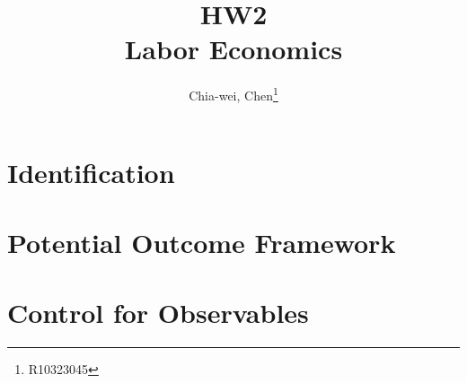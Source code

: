 \documentclass[12pt]{article}
\author{Chia-wei, Chen\thanks{R10323045}}
\title{HW2 \\ Labor Economics}
\begin{document}
    \maketitle

    \section{Identification}
    
    
    
    

    \section{Potential Outcome Framework}
    

    \section{Control for Observables}
    
    
  
\end{document}
